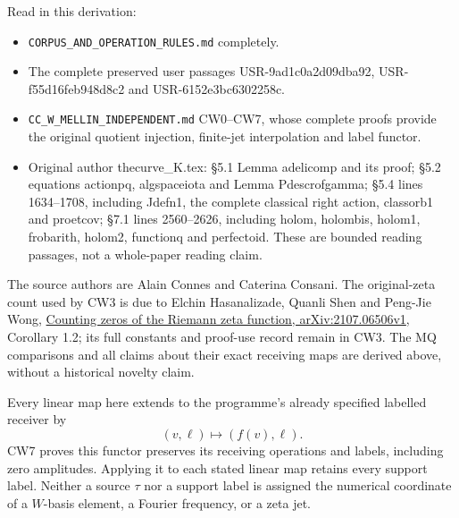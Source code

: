 Read in this derivation:

\begin{itemize}
\tightlist
\item
  \nolinkurl{CORPUS_AND_OPERATION_RULES.md} completely.
\item
  The complete preserved user passages USR-9ad1c0a2d09dba92,
  USR-f55d16feb948d8c2 and USR-6152e3bc6302258c.
\item
  \nolinkurl{CC_W_MELLIN_INDEPENDENT.md} CW0--CW7, whose complete proofs provide
  the original quotient injection, finite-jet interpolation and label
  functor.
\item
  Original author thecurve\_K.tex: §5.1 Lemma adelicomp and its proof;
  §5.2 equations actionpq, algspaceiota and Lemma Pdescrofgamma; §5.4
  lines 1634--1708, including Jdefn1, the complete classical right
  action, classorb1 and proetcov; §7.1 lines 2560--2626, including
  holom, holombis, holom1, frobarith, holom2, functionq and perfectoid.
  These are bounded reading passages, not a whole-paper reading claim.
\end{itemize}

The source authors are Alain Connes and Caterina Consani. The
original-zeta count used by CW3 is due to Elchin Hasanalizade, Quanli
Shen and Peng-Jie Wong,
\href{https://arxiv.org/abs/2107.06506v1}{Counting zeros of the Riemann
zeta function, arXiv:2107.06506v1}, Corollary 1.2; its full constants
and proof-use record remain in CW3. The MQ comparisons and all claims
about their exact receiving maps are derived above, without a historical
novelty claim.

Every linear map here extends to the programme's already specified
labelled receiver by \[
(v,\ell)\longmapsto(f(v),\ell).
\] CW7 proves this functor preserves its receiving operations and
labels, including zero amplitudes. Applying it to each stated linear map
retains every support label. Neither a source \(\tau\) nor a support
label is assigned the numerical coordinate of a \(W\)-basis element, a
Fourier frequency, or a zeta jet.
